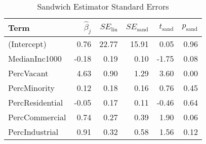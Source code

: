 \begin{table}[ht]
\centering
\begin{tabular}{lrrrrr}
  \hline
Term & $\widehat{\beta}_{j}$ & $SE_{\text{lin}}$ & $SE_{\text{sand}}$ & $t_{\text{sand}}$ & $p_{\text{sand}}$ \\ 
  \hline
(Intercept) & 0.76 & 22.77 & 15.91 & 0.05 & 0.96 \\ 
  MedianInc1000 & -0.18 & 0.19 & 0.10 & -1.75 & 0.08 \\ 
  PercVacant & 4.63 & 0.90 & 1.29 & 3.60 & 0.00 \\ 
  PercMinority & 0.12 & 0.18 & 0.16 & 0.76 & 0.45 \\ 
  PercResidential & -0.05 & 0.17 & 0.11 & -0.46 & 0.64 \\ 
  PercCommercial & 0.74 & 0.27 & 0.39 & 1.90 & 0.06 \\ 
  PercIndustrial & 0.91 & 0.32 & 0.58 & 1.56 & 0.12 \\ 
   \hline
\end{tabular}
\caption{Sandwich Estimator Standard Errors} 
\end{table}
